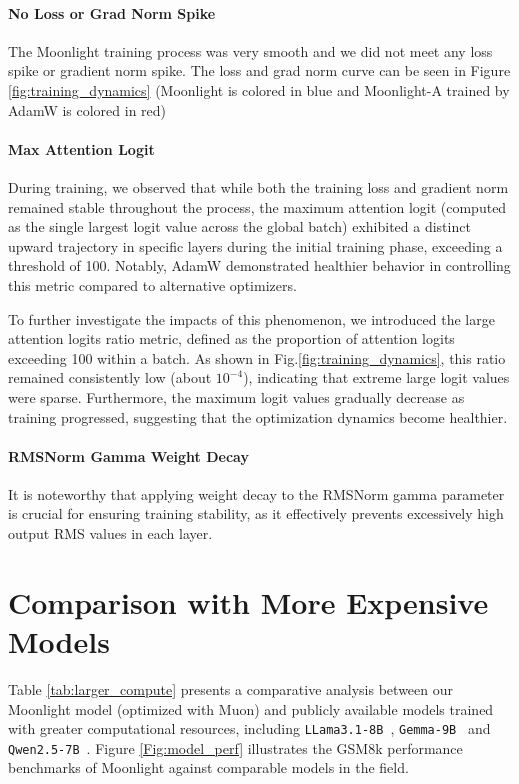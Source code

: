 \paragraph{No Loss or Grad Norm Spike} The Moonlight training process was very smooth and we did not meet any loss spike or gradient norm spike. The loss and grad norm curve can be seen in Figure \ref{fig:training_dynamics} (Moonlight is colored in blue and Moonlight-A trained by AdamW is colored in red)


\paragraph{Max Attention Logit} During training, we observed that while both the training loss and gradient norm remained stable throughout the process, the maximum attention logit (computed as the single largest logit value across the global batch) exhibited a distinct upward trajectory in specific layers during the initial training phase, exceeding a threshold of 100. Notably, AdamW demonstrated healthier behavior in controlling this metric compared to alternative optimizers.

To further investigate the impacts of this phenomenon, we introduced the large attention logits ratio metric, defined as the proportion of attention logits exceeding 100 within a batch. As shown in Fig.\ref{fig:training_dynamics}, this ratio remained consistently low (about $10^{-4}$), indicating that extreme large logit values were sparse. Furthermore, the maximum logit values gradually decrease as training progressed, suggesting that the optimization dynamics become healthier.

\paragraph{RMSNorm Gamma Weight Decay} It is noteworthy that applying weight decay to the RMSNorm gamma parameter is crucial for ensuring training stability, as it effectively prevents excessively high output RMS values in each layer.


\section{Comparison with More Expensive Models}
\label{sec:appendix:comparisons}


Table \ref{tab:larger_compute} presents a comparative analysis between our Moonlight model (optimized with Muon) and publicly available models trained with greater computational resources, including \texttt{LLama3.1-8B}~\citep{grattafiori2024llama3herdmodels}, \texttt{Gemma-9B}~\citep{team2024gemma} and \texttt{Qwen2.5-7B}~\citep{qwen2.5}. Figure \ref{Fig:model_perf} illustrates the GSM8k performance benchmarks of Moonlight against comparable models in the field.

